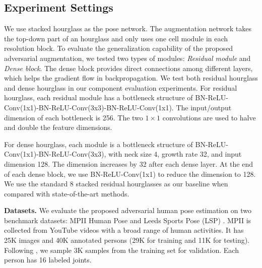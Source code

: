 \documentclass[10pt,twocolumn,letterpaper]{article}
\begin{document}
\subsection{Experiment Settings}
We use stacked hourglass \cite{newell2016stacked} as the pose network. The augmentation network takes the top-down part of an hourglass and only uses one cell module in each resolution block. To evaluate the generalization capability of the proposed adversarial augmentation, we tested two types of modules: {\it Residual module}\cite{he2016deep} and {\it Dense block}\cite{huang2016densely}.
The dense block provides direct connections among different layers, which helps the gradient flow in backpropagation.%
We test both residual hourglass and dense hourglass in our component evaluation experiments. For residual hourglass, each residual module has a bottleneck structure of BN-ReLU-Conv(1x1)-BN-ReLU-Conv(3x3)-BN-ReLU-Conv(1x1). The input/output dimension of each bottleneck is 256. The two $1\times 1$ convolutions are used to halve and double the feature dimensions.

For dense hourglass, each module is a bottleneck structure of BN-ReLU-Conv(1x1)-BN-ReLU-Conv(3x3), with neck size 4, growth rate 32, and input dimension 128. The dimension increases by 32 after each dense layer. At the end of each dense block, we use BN-ReLU-Conv(1x1) to reduce the dimension to 128. We use the standard 8 stacked residual hourglasses \cite{newell2016stacked} as our baseline when compared with state-of-the-art methods.

{\bf Datasets.} We evaluate the proposed adversarial human pose estimation on two benchmark datasets: MPII Human Pose \cite{andriluka14cvpr} and  Leeds Sports Pose (LSP) \cite{johnson2010lsp}. MPII is collected from YouTube videos with a broad range of human activities. It has 25K images and 40K annotated persons (29K for training and 11K for testing). Following \cite{tompson2014joint}, we sample 3K samples from the training set for validation. Each person has 16 labeled joints. 
\end{document}
